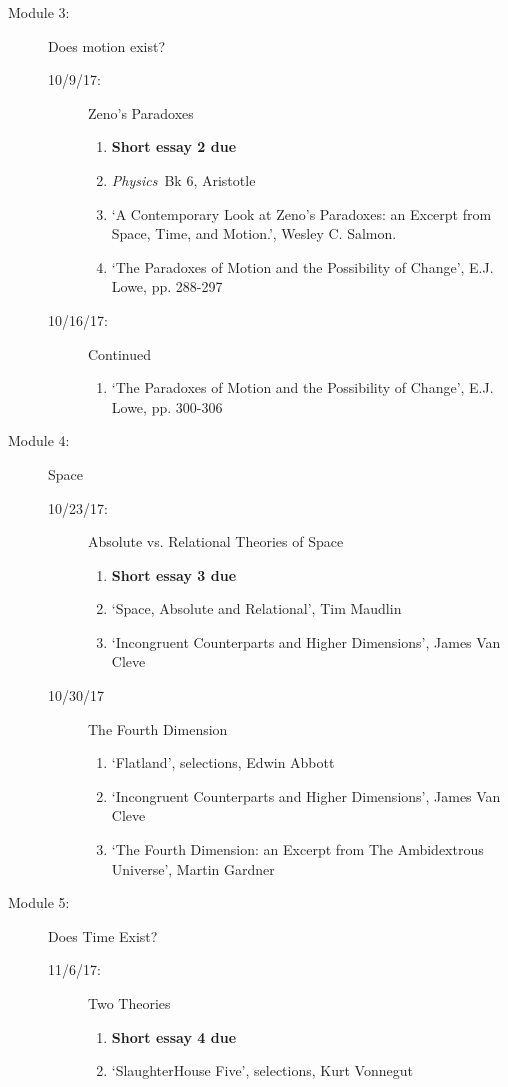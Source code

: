 \documentclass[article,oneside]{memoir}
\begin{document}
\begin{description}
\begin{description}
\end{description}

\item[Module 3:] Does motion exist? 
\begin{description}
\item [10/9/17:] Zeno's Paradoxes
\begin{enumerate}
\item \textbf{Short essay 2 due}
\item \emph{Physics}\ Bk 6, Aristotle
\item `A Contemporary Look at Zeno’s Paradoxes: an Excerpt from Space, Time, and Motion.', Wesley C. Salmon. 
\item `The Paradoxes of Motion and the Possibility of Change', E.J. Lowe, pp. 288-297
\end{enumerate}

\item[10/16/17:] Continued
\begin{enumerate}
\item `The Paradoxes of Motion and the Possibility of Change', E.J. Lowe, pp. 300-306
\end{enumerate}
\end{description}

\item[Module 4:] Space 
\begin{description}
\item[10/23/17:] Absolute vs. Relational Theories of Space
\begin{enumerate}
\item \textbf{Short essay 3 due}
\item `Space, Absolute and Relational', Tim Maudlin
\item `Incongruent Counterparts and Higher Dimensions', James Van Cleve
\end{enumerate}

\item[10/30/17] The Fourth Dimension
\begin{enumerate} 
\item `Flatland', selections, Edwin Abbott 
\item `Incongruent Counterparts and Higher Dimensions', James Van Cleve
\item `The Fourth Dimension: an Excerpt from The Ambidextrous Universe', Martin Gardner
\end{enumerate}
\end{description}


\item[Module 5:] Does Time Exist? 
\begin{description}
\item [11/6/17:] Two Theories
\begin{enumerate}
\item \textbf{Short essay 4 due}
\item `SlaughterHouse Five', selections, Kurt Vonnegut
\end{enumerate}


\end{description}
\end{description}
\end{document}
